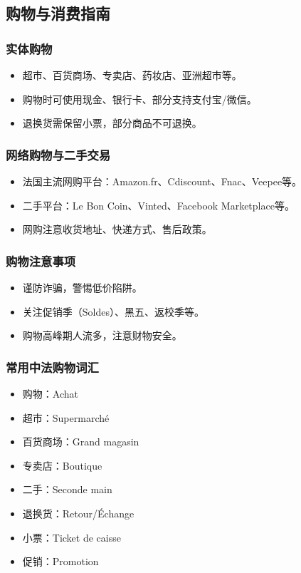 \subsection{购物与消费指南}

\subsubsection{实体购物}
\begin{itemize}
    \item 超市、百货商场、专卖店、药妆店、亚洲超市等。
    \item 购物时可使用现金、银行卡、部分支持支付宝/微信。
    \item 退换货需保留小票，部分商品不可退换。
\end{itemize}

\subsubsection{网络购物与二手交易}
\begin{itemize}
    \item 法国主流网购平台：Amazon.fr、Cdiscount、Fnac、Veepee等。
    \item 二手平台：Le Bon Coin、Vinted、Facebook Marketplace等。
    \item 网购注意收货地址、快递方式、售后政策。
\end{itemize}

\subsubsection{购物注意事项}
\begin{itemize}
    \item 谨防诈骗，警惕低价陷阱。
    \item 关注促销季（Soldes）、黑五、返校季等。
    \item 购物高峰期人流多，注意财物安全。
\end{itemize}

\subsubsection{常用中法购物词汇}
\begin{itemize}
    \item 购物：Achat
    \item 超市：Supermarché
    \item 百货商场：Grand magasin
    \item 专卖店：Boutique
    \item 二手：Seconde main
    \item 退换货：Retour/Échange
    \item 小票：Ticket de caisse
    \item 促销：Promotion
\end{itemize}
